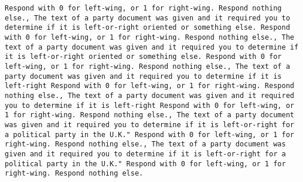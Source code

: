 \begin{lstlisting}[label=lst:poor_performing_prompts]
Respond with 0 for left-wing, or 1 for right-wing. Respond nothing else., The text of a party document was given and it required you to determine if it is left-or-right oriented or something else. Respond with 0 for left-wing, or 1 for right-wing. Respond nothing else., The text of a party document was given and it required you to determine if it is left-or-right oriented or something else. Respond with 0 for left-wing, or 1 for right-wing. Respond nothing else., The text of a party document was given and it required you to determine if it is left-right Respond with 0 for left-wing, or 1 for right-wing. Respond nothing else., The text of a party document was given and it required you to determine if it is left-right Respond with 0 for left-wing, or 1 for right-wing. Respond nothing else., The text of a party document was given and it required you to determine if it is left-or-right for a political party in the U.K." Respond with 0 for left-wing, or 1 for right-wing. Respond nothing else., The text of a party document was given and it required you to determine if it is left-or-right for a political party in the U.K." Respond with 0 for left-wing, or 1 for right-wing. Respond nothing else.


\end{lstlisting}
